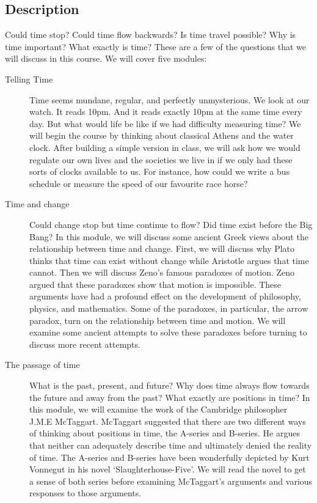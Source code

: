 \documentclass[oneside, 10pt]{article}
\begin{document}
\thispagestyle{fancy}
\subsection*{Description}
Could time stop? Could time flow backwards? Is time travel possible? Why is time important? What exactly is time? These are a few of the questions that we will discuss in this course. We will cover five modules:
\begin{description}
\item[Telling Time] Time seems mundane, regular, and perfectly unmysterious. We look at our watch. It reads 10pm. And it reads exactly 10pm at the same time every day. But what would life be like if we had difficulty measuring time? We will begin the course by thinking about classical Athens and the water clock. After building a simple version in class, we will ask how we would regulate our own lives and the societies we live in if we only had these sorts of clocks available to us. For instance, how could we write a bus schedule or measure the speed of our favourite race horse?  

\item[Time and change] Could change stop but time continue to flow? Did time exist before the Big Bang? In this module, we will discuss some ancient Greek views about the relationship between time and change. First, we will discuss why Plato thinks that time can exist without change while Aristotle argues that time cannot. Then we will discuss Zeno's famous paradoxes of motion. Zeno argued that these paradoxes show that motion is impossible. These arguments have had a profound effect on the development of philosophy, physics, and mathematics.  Some of the paradoxes, in particular, the arrow paradox, turn on the relationship between time and motion.  We will examine some ancient attempts to solve these paradoxes before turning to discuss more recent attempts. 

\item[The passage of time] What is the past, present, and future? Why does time always flow towards the future and away from the past? What exactly are positions in time?  In this module, we will examine the work of the Cambridge philosopher J.M.E McTaggart. McTaggart suggested that there are two different ways of thinking about positions in time, the A-series and B-series. He argues that neither can adequately describe time and ultimately denied the reality of time. The A-series and B-series have been wonderfully depicted by Kurt Vonnegut in his novel `Slaughterhouse-Five'. We will read the novel to get a sense of both series before examining McTaggart's arguments and various responses to those arguments.


\end{description}
\end{document}
